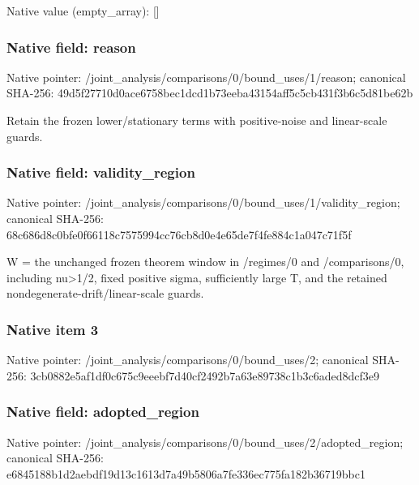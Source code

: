 \documentclass[10pt,a4paper]{article}
\begin{document}
Native value (empty\_\allowbreak{}array): []

\subsubsection{Native field: reason}
Native pointer: /joint\_\allowbreak{}analysis/comparisons/0/bound\_\allowbreak{}uses/1/reason; canonical SHA-256: 49d5f27710d0ace6758bec1dcd1b73eeba43154aff5c5cb431f3b6c5d81be62b

\begingroup\raggedright\sloppy Retain the frozen lower/\allowbreak{}stationary terms with positive-noise and linear-scale guards.\par\endgroup

\subsubsection{Native field: validity\_\allowbreak{}region}
Native pointer: /joint\_\allowbreak{}analysis/comparisons/0/bound\_\allowbreak{}uses/1/validity\_\allowbreak{}region; canonical SHA-256: 68c686d8c0bfe0f66118c7575994cc76cb8d0e4e65de7f4fe884c1a047c71f5f

\begingroup\raggedright\sloppy W =\allowbreak{} the unchanged frozen theorem window in /\allowbreak{}regimes/\allowbreak{}0 and /\allowbreak{}comparisons/\allowbreak{}0,\allowbreak{} including nu>1/\allowbreak{}2,\allowbreak{} fixed positive sigma,\allowbreak{} sufficiently large T,\allowbreak{} and the retained nondegenerate-drift/\allowbreak{}linear-scale guards.\par\endgroup

\subsubsection{Native item 3}
Native pointer: /joint\_\allowbreak{}analysis/comparisons/0/bound\_\allowbreak{}uses/2; canonical SHA-256: 3cb0882e5af1df0c675c9eeebf7d40cf2492b7a63e89738c1b3c6aded8dcf3e9

\subsubsection{Native field: adopted\_\allowbreak{}region}
Native pointer: /joint\_\allowbreak{}analysis/comparisons/0/bound\_\allowbreak{}uses/2/adopted\_\allowbreak{}region; canonical SHA-256: e6845188b1d2aebdf19d13c1613d7a49b5806a7fe336ec775fa182b36719bbc1
\end{document}
